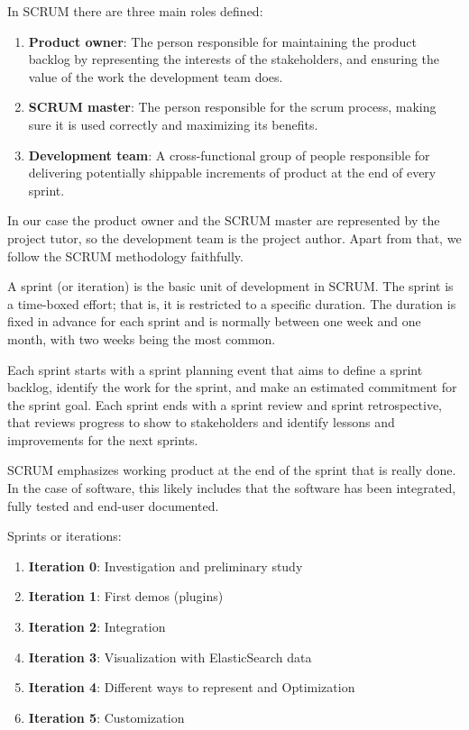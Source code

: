 \documentclass[a4paper, 12pt]{book}
\begin{document}
In SCRUM there are three main roles defined:	

\begin{enumerate}
\item \textbf{Product owner}: The person responsible for maintaining the product backlog by representing the interests of the stakeholders, and ensuring the value of the work the development team does.
\item \textbf{SCRUM master}: The person responsible for the scrum process, making sure it is used correctly and maximizing its benefits.
\item \textbf{Development team}: A cross-functional group of people responsible for delivering potentially shippable increments of product at the end of every sprint.
\end{enumerate}

In our case the product owner and the SCRUM master are represented by the project tutor, so the development team is the project author. Apart from that, we follow the SCRUM methodology faithfully.

A sprint (or iteration) is the basic unit of development in SCRUM. The sprint is a time-boxed effort; that is, it is restricted to a specific duration. The duration is fixed in advance for each sprint and is normally between one week and one month, with two weeks being the most common.

Each sprint starts with a sprint planning event that aims to define a sprint backlog, identify the work for the sprint, and make an estimated commitment for the sprint goal. Each sprint ends with a sprint review and sprint retrospective, that reviews progress to show to stakeholders and identify lessons and improvements for the next sprints.

SCRUM emphasizes working product at the end of the sprint that is really done. In the case of software, this likely includes that the software has been integrated, fully tested and end-user documented.

Sprints or iterations:
\begin{enumerate}
\item \textbf{Iteration 0}: Investigation and preliminary study
\item \textbf{Iteration 1}: First demos (plugins)
\item \textbf{Iteration 2}: Integration
\item \textbf{Iteration 3}: Visualization with ElasticSearch data
\item \textbf{Iteration 4}: Different ways to represent and Optimization
\item \textbf{Iteration 5}: Customization
\end{enumerate}
\end{document}
